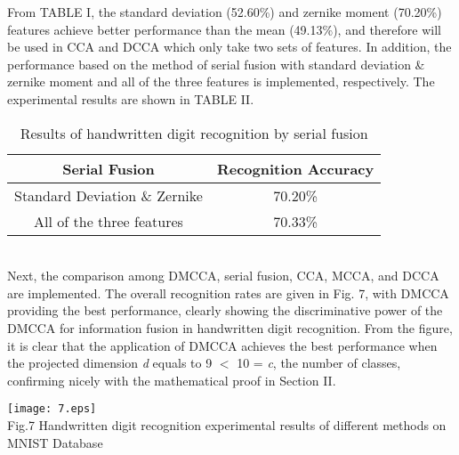 \documentclass[journal]{IEEEtran}
\begin{document}
From TABLE I, the standard deviation (52.60\%) and zernike moment (70.20\%) features achieve better performance than the mean (49.13$\%$), and therefore will be used in CCA and DCCA which only take two sets of features. In addition, the performance based on the method of serial fusion with standard deviation \& zernike moment and all of the three features is implemented, respectively. The experimental results are shown in TABLE II.\\
\vspace*{-10pt}
\begin{table}[h]
\normalsize
\renewcommand{\arraystretch}{1.0}
\caption{\normalsize{Results of handwritten digit recognition by serial fusion}}
\setlength{\abovecaptionskip}{0pt}
\setlength{\belowcaptionskip}{10pt}
\centering
\tabcolsep 0.073in
\begin{tabular}{cc}
\hline
Serial Fusion & Recognition Accuracy\\
\hline
Standard Deviation \& Zernike  &70.20\%\\
All of the three features &70.33\%\\
\hline
\end{tabular}
\end{table}\\\indent
Next, the comparison among DMCCA, serial fusion, CCA, MCCA, and DCCA are implemented. %
The overall recognition rates are given in Fig. 7, with DMCCA providing the best performance, clearly showing the discriminative power of the DMCCA for information fusion in handwritten digit recognition. From the figure, it is clear that the application of DMCCA achieves the best performance when the projected dimension \emph{d} equals to 9 $<$ 10 = \emph{c}, the number of classes, confirming nicely with the mathematical proof in Section II.\\
\begin{figure*}[t]
\centering
\texttt{[image: 7.eps]}\\ Fig.7 Handwritten digit recognition experimental results of different methods on MNIST Database\\
\end{figure*}
\end{document}

